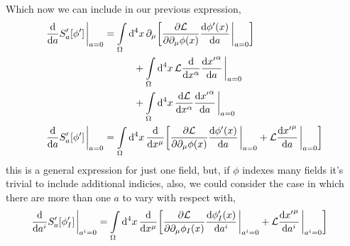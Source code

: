 Which now we can include in our previous expression,
\begin{align}
    \dv{}{a}S_a'\qty[\phi']\eval_{a=0}&= \int\limits_{\Omega}\dd[4]{x}\partial_\mu\qty[\pdv{\mathcal L}{\partial_\mu\phi\qty(x)}\dv{\phi'\qty(x)}{a}\eval_{a=0}]\nonumber\\
    &\quad\quad\quad+\int\limits_{\Omega}\dd[4]{x}\mathcal L\dv{}{x^\alpha}\dv{{x'}^\alpha}{a}\eval_{a=0}\nonumber\\
    &\quad\quad\quad+\int\limits_{\Omega}\dd[4]{x}\dv{\mathcal L}{x^\alpha}\dv{{x'}^\alpha}{a}\eval_{a=0}\\
    \dv{}{a}S_a'\qty[\phi']\eval_{a=0}&= \int\limits_{\Omega}\dd[4]{x}\dv{}{x^\mu}\qty[\pdv{\mathcal L}{\partial_\mu\phi\qty(x)}\dv{\phi'\qty(x)}{a}\eval_{a=0}+\mathcal L\dv{{x'}^\mu}{a}\eval_{a=0}]
\end{align}
this is a general expression for just one field, but, if $\phi$ indexes many fields it's trivial to include additional indicies, also, 
we could consider the case in which there are more than one $a$ to vary with respect with,
\begin{align}
    \dv{}{a^i}S_a'\qty[\phi_I']\eval_{a^i=0}&= \int\limits_{\Omega}\dd[4]{x}\dv{}{x^\mu}\qty[\pdv{\mathcal L}{\partial_\mu\phi_I\qty(x)}\dv{\phi_I'\qty(x)}{a^i}\eval_{a^i=0}+\mathcal L\dv{{x'}^\mu}{a^i}\eval_{a^i=0}]
\end{align}

